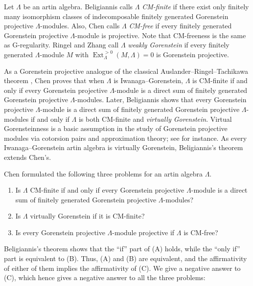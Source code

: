 \documentclass{amsart}
\theoremstyle{definition}
\theoremstyle{remark}
\numberwithin{equation}{thm}
\def\Ext{\operatorname{Ext}}
\begin{document}
Let $\Lambda$ be an artin algebra.
Beligiannis \cite{B98} calls $\Lambda$ {\em CM-finite} if there exist only finitely many isomorphism classes of indecomposable finitely generated Gorenstein projective $\Lambda$-modules.
Also, Chen \cite{Che12} calls $\Lambda$ {\em CM-free} if every finitely generated Gorenstein projective $\Lambda$-module is projective.
Note that CM-freeness is the same as G-regularity.
Ringel and Zhang \cite{RZ} call $\Lambda$ {\em weakly Gorenstein} if every finitely generated $\Lambda$-module $M$ with $\Ext_\Lambda^{>0}(M,\Lambda)=0$ is Gorenstein projective.

As a Gorenstein projective analogue of the classical Auslander--Ringel--Tachikawa theorem \cite{A76,RT}, Chen \cite{Che08} proves that when $\Lambda$ is Iwanaga--Gorenstein, $\Lambda$ is CM-finite if and only if every Gorenstein projective $\Lambda$-module is a direct sum of finitely generated Gorenstein projective $\Lambda$-modules.
Later, Beligiannis \cite{B98} shows that every Gorenstein projective $\Lambda$-module is a direct sum of finitely generated Gorenstein projective $\Lambda$-modules if and only if $\Lambda$ is both CM-finite and {\em virtually Gorenstein}.
Virtual Gorensteinness is a basic assumption in the study of Gorenstein projective modules via cotorsion pairs and approximation theory; see \cite{B05,B98,BR,BK,Che17} for instance.
As every Iwanaga--Gorenstein artin algebra is virtually Gorenstein, Beligiannis's theorem extends Chen's.

Chen \cite[Problems A,B,C]{Che17} formulated the following three problems for an artin algebra $\Lambda$.

\begin{enumerate}[\rm(A)]
\item Is $\Lambda$ CM-finite if and only if every Gorenstein projective $\Lambda$-module is a direct sum of finitely generated Gorenstein projective $\Lambda$-modules?
\item Is $\Lambda$ virtually Gorenstein if it is CM-finite?
\item Is every Gorenstein projective $\Lambda$-module projective if $\Lambda$ is CM-free?
\end{enumerate}

\noindent Beligiannis's theorem \cite{B98} shows that the ``if'' part of (A) holds, while the ``only if'' part is equivalent to (B). 
Thus, (A) and (B) are equivalent, and the affirmativity of either of them implies the affirmativity of (C).
We give a negative answer to (C), which hence gives a negative answer to all the three problems:
\end{document}

